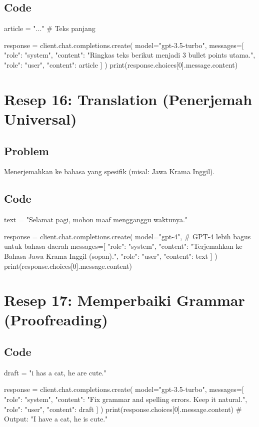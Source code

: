 \subsection*{Code}
\begin{codeblock}[language=Python]
article = "..." # Teks panjang

response = client.chat.completions.create(
    model="gpt-3.5-turbo",
    messages=[
        {"role": "system", "content": "Ringkas teks berikut menjadi 3 bullet points utama."},
        {"role": "user", "content": article}
    ]
)
print(response.choices[0].message.content)
\end{codeblock}

\section{Resep 16: Translation (Penerjemah Universal)}

\subsection*{Problem}
Menerjemahkan ke bahasa yang spesifik (misal: Jawa Krama Inggil).

\subsection*{Code}
\begin{codeblock}[language=Python]
text = "Selamat pagi, mohon maaf mengganggu waktunya."

response = client.chat.completions.create(
    model="gpt-4", # GPT-4 lebih bagus untuk bahasa daerah
    messages=[
        {"role": "system", "content": "Terjemahkan ke Bahasa Jawa Krama Inggil (sopan)."},
        {"role": "user", "content": text}
    ]
)
print(response.choices[0].message.content)
\end{codeblock}

\section{Resep 17: Memperbaiki Grammar (Proofreading)}

\subsection*{Code}
\begin{codeblock}[language=Python]
draft = "i has a cat, he are cute."

response = client.chat.completions.create(
    model="gpt-3.5-turbo",
    messages=[
        {"role": "system", "content": "Fix grammar and spelling errors. Keep it natural."},
        {"role": "user", "content": draft}
    ]
)
print(response.choices[0].message.content)
# Output: "I have a cat, he is cute."
\end{codeblock}

